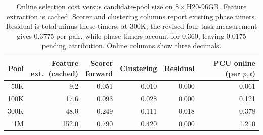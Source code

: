 \begin{table}[t]
\centering
\small
\setlength{\tabcolsep}{2.5pt}
\begin{tabular}{rrrrrr}
\toprule
Pool & \shortstack{Feature\\ext.\ (cached)} & \shortstack{Scorer\\forward} & Clustering & Residual & \shortstack{PCU online\\(per $p,t$)} \\
\midrule
50K & 9.2 & 0.051 & 0.010 & 0.000 & 0.061 \\
100K & 17.6 & 0.093 & 0.028 & 0.000 & 0.121 \\
300K & 48.0 & 0.249 & 0.111 & 0.018 & 0.378 \\
1M & 152.0 & 0.790 & 0.420 & 0.000 & 1.210 \\
\bottomrule
\end{tabular}
\caption{Online selection cost versus candidate-pool size on $8{\times}$H20-96GB.
Feature extraction is cached. Scorer and clustering columns report existing
phase timers. Residual is total minus these timers; at 300K, the revised
four-task measurement gives 0.3775 per pair, while phase timers account for
0.360, leaving 0.0175 pending attribution. Online columns show three decimals.}
\label{tab:pool-scaling}
\end{table}
